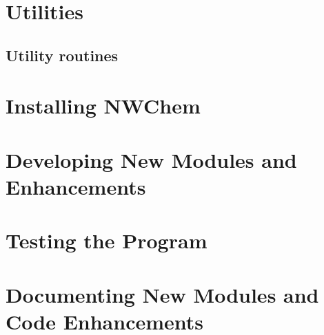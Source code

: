 \chapter{Utilities}



\section{Utility routines}



\chapter{Installing NWChem}




\chapter{Developing New Modules and Enhancements}




\chapter{Testing the Program}


\chapter{Documenting New Modules and Code Enhancements}

%

\appendix
 

